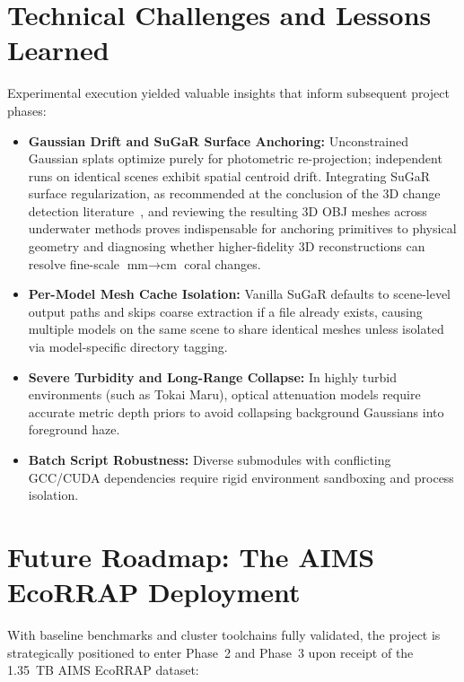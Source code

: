\section{Technical Challenges and Lessons Learned}
\label{sec:lessons_learned}
Experimental execution yielded valuable insights that inform subsequent project phases:
\begin{itemize}
    \item \textbf{Gaussian Drift and SuGaR Surface Anchoring:} Unconstrained Gaussian splats optimize purely for photometric re-projection; independent runs on identical scenes exhibit spatial centroid drift. Integrating SuGaR surface regularization, as recommended at the conclusion of the 3D change detection literature~\cite{galappaththige2026pixelsprimitivesscenechange}, and reviewing the resulting 3D OBJ meshes across underwater methods proves indispensable for anchoring primitives to physical geometry and diagnosing whether higher-fidelity 3D reconstructions can resolve fine-scale $\text{mm} \to \text{cm}$ coral changes.
    \item \textbf{Per-Model Mesh Cache Isolation:} Vanilla SuGaR defaults to scene-level output paths and skips coarse extraction if a file already exists, causing multiple models on the same scene to share identical meshes unless isolated via model-specific directory tagging.
    \item \textbf{Severe Turbidity and Long-Range Collapse:} In highly turbid environments (such as Tokai Maru), optical attenuation models require accurate metric depth priors to avoid collapsing background Gaussians into foreground haze.
    \item \textbf{Batch Script Robustness:} Diverse submodules with conflicting GCC/CUDA dependencies require rigid environment sandboxing and process isolation.
\end{itemize}

\section{Future Roadmap: The AIMS EcoRRAP Deployment}
\label{sec:future_roadmap}
With baseline benchmarks and cluster toolchains fully validated, the project is strategically positioned to enter Phase~2 and Phase~3 upon receipt of the 1.35~TB AIMS EcoRRAP dataset:

